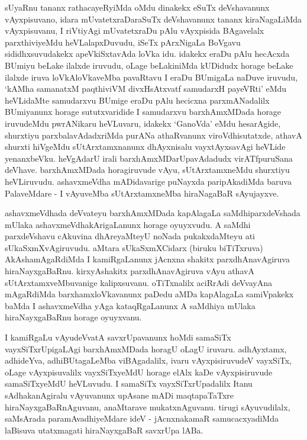 \begin{artha}
sUyaRnu tananx rathacayeRyiMda oMdu dinakekx eSuTx deVshavanunx vAyxpisu\-vano, idara mUvatetxraDaraSuTx deVshavanunx tananx kiraNagaLiMda vAyxpisuvanu, I riVtiyAgi mUvatetxraDu pAlu vAyxpisida BAgavelalx parxthiviyeMdu heVLalapxDuvudu, iSeTx pArxNigaLa BoVgavu sididhxsuvudakekx apeVkiSxtavAda loVka idu. idakekx eraDu pAlu hecAcxda BUmiyu beLake ilalxde iruvudu, oLage beLakiniMda kUDidudx horage beLake ilalxde iruva loVkAloVkaveMba pavaRtavu I eraDu BUmigaLa naDuve iruvudu, `kAMha samanatxM paqthiviVM divxHsAtxvatf samudarxH payeVRti' eMdu heVLidaMte samudarxvu BUmige eraDu pAlu hecicxna parxmANadalilx BUmiyanunx horage sututxvaridide I samudarxvu barxhAmxMDada horage iruvudeMdu pwrANikaru heVLuvaru, idakekx `GanoVda' eMdu hesarAgide, shurxtiyu parxbalavAdadxriMda purANa athaRvanunx viroVdhisutatxde, athavA shurxti hiVgeMdu sUtArxtamxnanunx dhAyxnisalu vayxtAyxsavAgi heVLide yenanxbeVku. heVgAdarU irali barxhAmxMDarUpavAdadudx virATfpuruSana deVhave. barxhAmxMDada horagiruvude vAyu, sUtArxtamxneMdu shurxtiyu heVLiruvudu. ashavxmeVdha mADidavarige puNayxda paripAkadiMda baruva PalaveMdare - I vAyuveMba sUtArxtamxneMba hiraNagaBaR sAyujayxve.
\end{artha}

\begin{artha}
ashavxmeVdhada deVvateyu barxhAmxMDada kapAlagaLa saMdhiparxdeVshada mUlaka ashavxmeVdhakArigaLanunx horage oyuyxvudu. A saMdhi parxdeVshavu cAkuvina dhAreyaMteyU noNada pukakxdaMteyu ati sUkaSxmXvAgiruvudu. aMtara sUkaSxmXCidarx (biruku biTiTxruva) AkAshamAgaRdiMda I kamiRgaLanunx jAcnxna shakitx parxdhAnavAgiruva hiraNayxgaBaRnu. kirxyAshakitx parxdhAnavAgiruva vAyu athavA sUtArxtamxveMbuvanige kalipxsuvanu. oTiTxnalilx aciRrAdi deVvayAna mAgaRdiMda barxhamxloVkavanunx paDedu aMDa kapAlagaLa samiVpakekx baMda I ashavxmeVdha yAga kataqRgaLanunx A saMdhiya mUlaka hiraNayxgaBaRnu horage oyuyxvanu. 
\end{artha}

\begin{artha}
I kamiRgaLu vAyudeVvatA savxrUpavanunx hoMdi samaSiTx vayxSiTxrUpi\-gaLAgi barxhAmxMDada horagU oLagU iruvaru. adhAyxtamx, adhideYva, adhiBUta\-gaLeMba viBAgadalilx, ivaru vAyxpisiruvudeV vayxSiTx, oLage vAyxpisuvalilx vayxSiTxyeMdU \-horage elAlx kaDe vAyxpisiruvude samaSiTxyeMdU heVLuvudu. I samaSiTx vayxSiTxrUpa\-dalilx Itanu sAdhakanAgiralu vAyuvanunx upAsane mADi maqtapaTaTxre hiraNayx\-gaBaRnAguvanu, anaMtarave mukatxnAguvanu. tirugi sAyuvudilalx, saMsArada paramAvadhiyeMdare ideV - jAcnxnakamaR samucacxyadiMda laBisuva utatxmagati hiraNayxgaBaR savxrUpa lABa.
\end{artha}

